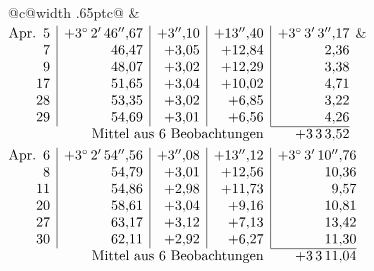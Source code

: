 \noindent\begin{tabular}{@{}c@{\hspace{.4em}\vrule width .65pt\hspace{.4em}}c@{}}
 &
 \\[.18ex]
\(\begin{array}[t]{@{}r|r|r|r|r@{}}
\text{Apr.}\enspace 5 & +3^\circ\,2'\,46''{,}67 & +3''{,}10 & +13''{,}40 & +3^\circ\,3'\,3''{,}17\\
7 & 46{,}47 & +3{,}05 & +12{,}84 & 2{,}36\\
9 & 48{,}07 & +3{,}02 & +12{,}29 & 3{,}38\\
17 & 51{,}65 & +3{,}04 & +10{,}02 & 4{,}71\\
28 & 53{,}35 & +3{,}02 & +6{,}85 & 3{,}22\\
29 & 54{,}69 & +3{,}01 & +6{,}56 & 4{,}26\\
\cline{5-5}
\multicolumn{4}{r}{\text{Mittel aus 6 Beobachtungen}} & +3\,3\,3{,}52
\end{array}\)
&
\(\begin{array}[t]{@{}r|r|r|r|r@{}}
\text{Apr.}\enspace 6 & +3^\circ\,2'\,54''{,}56 & +3''{,}08 & +13''{,}12 & +3^\circ\,3'\,10''{,}76\\
8 & 54{,}79 & +3{,}01 & +12{,}56 & 10{,}36\\
11 & 54{,}86 & +2{,}98 & +11{,}73 & 9{,}57\\
20 & 58{,}61 & +3{,}04 & +9{,}16 & 10{,}81\\
27 & 63{,}17 & +3{,}12 & +7{,}13 & 13{,}42\\
30 & 62{,}11 & +2{,}92 & +6{,}27 & 11{,}30\\
\cline{5-5}
\multicolumn{4}{r}{\text{Mittel aus 6 Beobachtungen}} & +3\,3\,11{,}04
\end{array}\)
\end{tabular}\par\medskip
